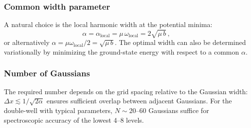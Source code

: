 \subsubsection{Common width parameter}

A natural choice is the local harmonic width at the potential minima:
\begin{equation}
  \alpha = \alpha_{\text{local}} = \mu\,\omega_{\text{local}} = 2\sqrt{\mu\,b}\,,
\end{equation}
or alternatively $\alpha = \mu\omega_{\text{local}}/2 = \sqrt{\mu\,b}$.
The optimal width can also be determined variationally by minimizing the ground-state
energy with respect to a common $\alpha$.

\subsubsection{Number of Gaussians}

The required number depends on the grid spacing relative to the Gaussian width:
$\Delta x \lesssim 1/\sqrt{2\alpha}$ ensures sufficient overlap between adjacent Gaussians.
For the double-well with typical parameters, $N \sim 20$--$60$ Gaussians suffice
for spectroscopic accuracy of the lowest 4--8 levels.

